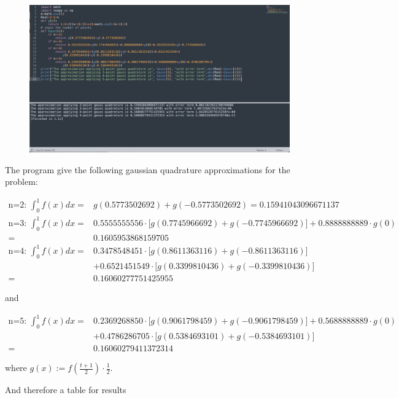 \documentclass{article}
\begin{document}
    \begin{figure}[h]
    \centering
    \includegraphics[scale=0.3]{Program4}
    \end{figure}

    The program give the following gaussian quadrature approximations for the problem:

    \begin{align*}
    \text{n=2: } \int_{0}^{1}f(x)dx=&g(0.5773502692)+g(-0.5773502692)=0.15941043096671137 \\
    \text{n=3: } \int_{0}^{1}f(x)dx=&0.5555555556\cdot \bigg[g(0.7745966692)+g(-0.7745966692)\bigg]+0.8888888889\cdot g(0)\\
    =&0.1605953868159705\\
    \text{n=4: } \int_{0}^{1}f(x)dx=&0.3478548451\cdot \bigg[g(0.8611363116)+g(-0.8611363116)\bigg]\\
    &+0.6521451549\cdot \bigg[g(0.3399810436)+g(-0.3399810436)\bigg] \\
    =&0.16060277751425955
    \end{align*}

    and

    \begin{align*}
    \text{n=5: } \int_{0}^{1}f(x)dx=&0.2369268850\cdot\bigg[g(0.9061798459)+g(-0.9061798459)\bigg]+0.5688888889\cdot g(0)\\
    &+0.4786286705\cdot \bigg[g(0.5384693101)+g(-0.5384693101)\bigg] \\
    =&0.16060279411372314
    \end{align*}

    where $g(x):=f(\frac{t+1}{2})\cdot \frac{1}{2}$.

    And therefore a table for results 
\end{document}
